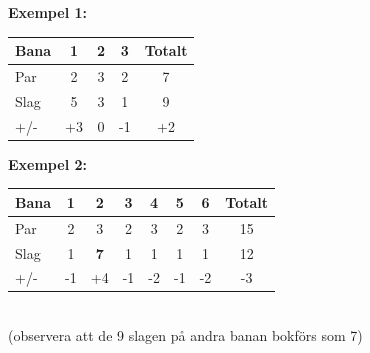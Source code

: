 \begin{figure}[!htb]
{\bf Exempel 1:}\\
\begin{tabular}{||l|c|c|c||c||}\hline \hline
Bana & 1 & 2 & 3 & Totalt \\ \hline \hline
Par & 2 & 3 & 2 & 7 \\ \hline 
Slag & 5 & 3 & 1 & 9 \\ \hline
+/- & +3 & 0 & -1 & +2 \\ \hline \hline
\end{tabular}
\endminipage\hfill
{}
{\bf Exempel 2:}\\
\begin{tabular}{||l|c|c|c|c|c|c||c||}\hline \hline
Bana & 1 & 2 & 3 & 4 & 5 & 6 & Totalt \\ \hline \hline
Par & 2 & 3 & 2 & 3 & 2 & 3 & 15 \\ \hline 
Slag & 1 & {\bf 7} & 1 & 1 & 1 & 1 & 12 \\ \hline
+/- & -1 & +4 & -1 & -2 & -1 & -2 & -3\\ \hline \hline
\end{tabular}\\
(observera att de 9 slagen på andra banan bokförs som 7)
\endminipage\hfill
\end{figure}

